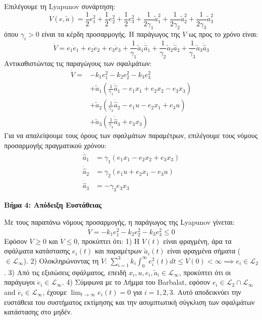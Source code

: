 \documentclass[a4paper,11pt]{article}
\begin{document}
\begin{answer}
Επιλέγουμε τη Lyapunov συνάρτηση:
\[ V(e, \tilde{a}) = \frac{1}{2} e_1^2 + \frac{1}{2} e_2^2 + \frac{1}{2} e_3^2 + \frac{1}{2\gamma_1} \tilde{a}_1^2 + \frac{1}{2\gamma_2} \tilde{a}_2^2 + \frac{1}{2\gamma_3} \tilde{a}_3^2 \]
όπου $\gamma_i > 0$ είναι τα κέρδη προσαρμογής. Η παράγωγος της $V$ ως προς το χρόνο είναι:
\[ \dot{V} = e_1 \dot{e}_1 + e_2 \dot{e}_2 + e_3 \dot{e}_3 + \frac{1}{\gamma_1} \tilde{a}_1 \dot{\hat{a}}_1 + \frac{1}{\gamma_2} \tilde{a}_2 \dot{\hat{a}}_2 + \frac{1}{\gamma_3} \tilde{a}_3 \dot{\hat{a}}_3 \]
Αντικαθιστώντας τις παραγώγους των σφαλμάτων:
\begin{align*}
    \dot{V} = &-k_1 e_1^2 - k_2 e_2^2 - k_3 e_3^2 \\
    &+ \tilde{a}_1 \left( \frac{1}{\gamma_1} \dot{\hat{a}}_1 - e_1 x_1 + e_2 x_2 - e_3 x_3 \right) \\
    &+ \tilde{a}_2 \left( \frac{1}{\gamma_2} \dot{\hat{a}}_2 - e_1 u - e_2 x_1 + e_3 u \right) \\
    &+ \tilde{a}_3 \left( \frac{1}{\gamma_3} \dot{\hat{a}}_3 + e_3 x_3 \right)
\end{align*}
Για να απαλείψουμε τους όρους των σφαλμάτων παραμέτρων, επιλέγουμε τους νόμους προσαρμογής πραγματικού χρόνου:
\begin{align*}
    \dot{\hat{a}}_1 &= \gamma_1 (e_1 x_1 - e_2 x_2 + e_3 x_3) \\
    \dot{\hat{a}}_2 &= \gamma_2 (e_1 u + e_2 x_1 - e_3 u) \\
    \dot{\hat{a}}_3 &= -\gamma_3 e_3 x_3
\end{align*}

\textbf{Βήμα 4: Απόδειξη Ευστάθειας}

Με τους παραπάνω νόμους προσαρμογής, η παράγωγος της Lyapunov γίνεται:
\[ \dot{V} = -k_1 e_1^2 - k_2 e_2^2 - k_3 e_3^2 \le 0 \]
Εφόσον $V \ge 0$ και $\dot{V} \le 0$, προκύπτει ότι:
1) Η $V(t)$ είναι φραγμένη, άρα τα σφάλματα κατάστασης $e_i(t)$ και παραμέτρων $\tilde{a}_i(t)$ είναι φραγμένα σήματα ($\in \mathcal{L}_\infty$).
2) Ολοκληρώνοντας τη $\dot{V}$: $\sum_{i=1}^3 k_i \int_0^\infty e_i^2(t) dt \le V(0) < \infty \implies e_i \in \mathcal{L}_2$.
3) Από τις εξισώσεις σφάλματος, επειδή $x_i, u, e_i, \tilde{a}_i \in \mathcal{L}_\infty$, προκύπτει ότι οι παράγωγοι $\dot{e}_i \in \mathcal{L}_\infty$.
4) Σύμφωνα με το Λήμμα του Barbalat, εφόσον $e_i \in \mathcal{L}_2 \cap \mathcal{L}_\infty$ and $\dot{e}_i \in \mathcal{L}_\infty$, έχουμε $\lim_{t \to \infty} e_i(t) = 0$ για $i = 1, 2, 3$.
Αυτό αποδεικνύει την ευστάθεια του συστήματος εκτίμησης και την ασυμπτωτική σύγκλιση των σφαλμάτων κατάστασης στο μηδέν.
\end{answer}
\end{document}

